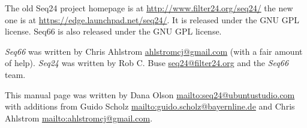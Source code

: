    The old Seq24 project homepage is at
   \url{http://www.filter24.org/seq24/} the new
   one is at \url{https://edge.launchpad.net/seq24/}.
   It is released under the GNU GPL license.
   Seq66 is also released under the GNU GPL license.

   \textsl{Seq66} was written by Chris Ahlstrom
   \href{mailto:ahlstromcj@gmail.com}{ahlstromcj@gmail.com}
   (with a fair amount of help).
   \textsl{Seq24} was written by Rob C. Buse
   \href{mailto:seq24@filter24.org}{seq24@filter24.org}
   and the \textsl{Seq66} team.

   This manual page was written by Dana Olson
   \url{mailto:seq24@ubuntustudio.com} with additions from Guido Scholz
   \url{mailto:guido.scholz@bayernline.de} and Chris Ahlstrom
   \url{mailto:ahlstromcj@gmail.com}.

